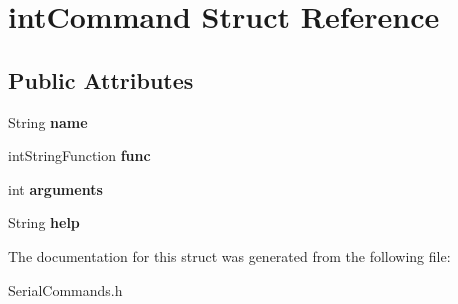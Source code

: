 \hypertarget{structint_command}{}\section{int\+Command Struct Reference}
\label{structint_command}
\subsection*{Public Attributes}
\begin{DoxyCompactItemize}
\item 
\mbox{\label{structint_command_a79937cd31781c7ff5b96705b0c4288bb}} 
String {\bfseries name}
\item 
\mbox{\label{structint_command_ae9db3aa75bca54507fcec11dc13eeaa6}} 
int\+String\+Function {\bfseries func}
\item 
\mbox{\label{structint_command_a69292d949f970785f5fb347b5779e760}} 
int {\bfseries arguments}
\item 
\mbox{\label{structint_command_a2b2356045ad35c72cebd28be2f23459e}} 
String {\bfseries help}
\end{DoxyCompactItemize}


The documentation for this struct was generated from the following file\+:\begin{DoxyCompactItemize}
\item 
Serial\+Commands.\+h\end{DoxyCompactItemize}

